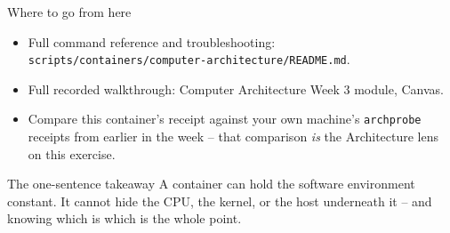 \documentclass[aspectratio=169,11pt]{beamer}
\begin{document}
\begin{frame}{Where to go from here}
\begin{itemize}
  \item Full command reference and troubleshooting:
    \texttt{scripts/containers/computer-architecture/README.md}.
  \item Full recorded walkthrough: Computer Architecture Week 3 module,
    Canvas.
  \item Compare this container's receipt against your own machine's
    \texttt{archprobe} receipts from earlier in the week -- that comparison
    \emph{is} the Architecture lens on this exercise.
\end{itemize}
\vspace{0.2cm}
\begin{exampleblock}{The one-sentence takeaway}
A container can hold the software environment constant. It cannot hide the
CPU, the kernel, or the host underneath it -- and knowing which is which is
the whole point.
\end{exampleblock}
\end{frame}
\end{document}
